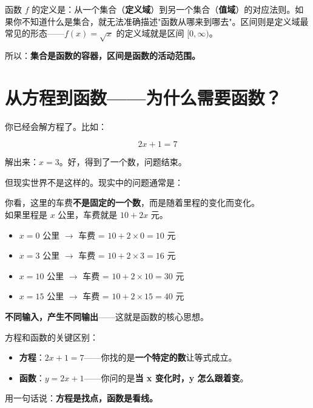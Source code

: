 \begin{notebox}[为什么要学集合和区间？]
函数 $f$ 的定义是：从一个集合（\textbf{定义域}）到另一个集合（\textbf{值域}）的对应法则。如果你不知道什么是集合，就无法准确描述"函数从哪来到哪去"。区间则是定义域最常见的形态——$f(x) = \sqrt{x}$ 的定义域就是区间 $[0,\infty)$。

所以：\textbf{集合是函数的容器，区间是函数的活动范围。}
\end{notebox}


\section{从方程到函数——为什么需要函数？}

你已经会解方程了。比如：

\[
2x + 1 = 7
\]

解出来：\(x = 3\)。好，得到了一个数，问题结束。

但现实世界不是这样的。现实中的问题通常是：

\begin{center}
\end{center}

你看，这里的车费\textbf{不是固定的一个数}，而是随着里程的变化而变化。\\
如果里程是 \(x\) 公里，车费就是 \(10 + 2x\) 元。

\begin{itemize}
  \item \(x = 0\) 公里 \(\rightarrow\) 车费 = \(10 + 2\times 0 = 10\) 元
  \item \(x = 3\) 公里 \(\rightarrow\) 车费 = \(10 + 2\times 3 = 16\) 元
  \item \(x = 10\) 公里 \(\rightarrow\) 车费 = \(10 + 2\times 10 = 30\) 元
  \item \(x = 15\) 公里 \(\rightarrow\) 车费 = \(10 + 2\times 15 = 40\) 元
\end{itemize}

\textbf{不同输入，产生不同输出}——这就是函数的核心思想。

\begin{notebox}
方程和函数的关键区别：
\begin{itemize}
  \item \textbf{方程}：\(2x + 1 = 7\)——你找的是\textbf{一个特定的数}让等式成立。
  \item \textbf{函数}：\(y = 2x + 1\)——你问的是\textbf{当 x 变化时，y 怎么跟着变}。
\end{itemize}
用一句话说：\textbf{方程是找点，函数是看线。}
\end{notebox}


